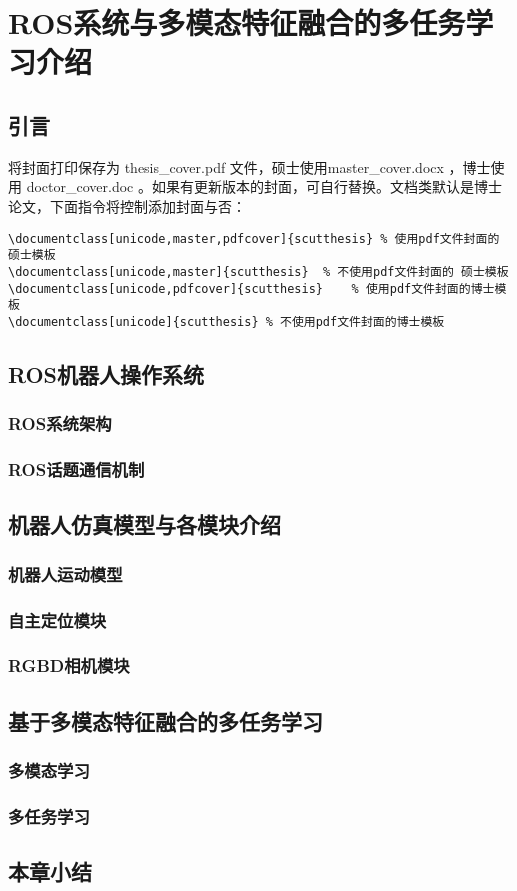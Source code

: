 \chapter{ROS系统与多模态特征融合的多任务学习介绍}
%

\section{引言}

将封面打印保存为 thesis\_cover.pdf 文件，硕士使用master\_cover.docx ，博士使用 doctor\_cover.doc 。如果有更新版本的封面，可自行替换。文档类默认是博士论文，下面指令将控制添加封面与否：
\begin{lstlisting}
\documentclass[unicode,master,pdfcover]{scutthesis}	% 使用pdf文件封面的 硕士模板
\documentclass[unicode,master]{scutthesis}	% 不使用pdf文件封面的 硕士模板
\documentclass[unicode,pdfcover]{scutthesis}	% 使用pdf文件封面的博士模板
\documentclass[unicode]{scutthesis}	% 不使用pdf文件封面的博士模板
\end{lstlisting}

\section{ROS机器人操作系统}
\subsection{ROS系统架构}
\subsection{ROS话题通信机制}

\section{机器人仿真模型与各模块介绍}
\subsection{机器人运动模型}
\subsection{自主定位模块}
\subsection{RGBD相机模块}

\section{基于多模态特征融合的多任务学习}
\subsection{多模态学习}
\subsection{多任务学习}
\section{本章小结}


